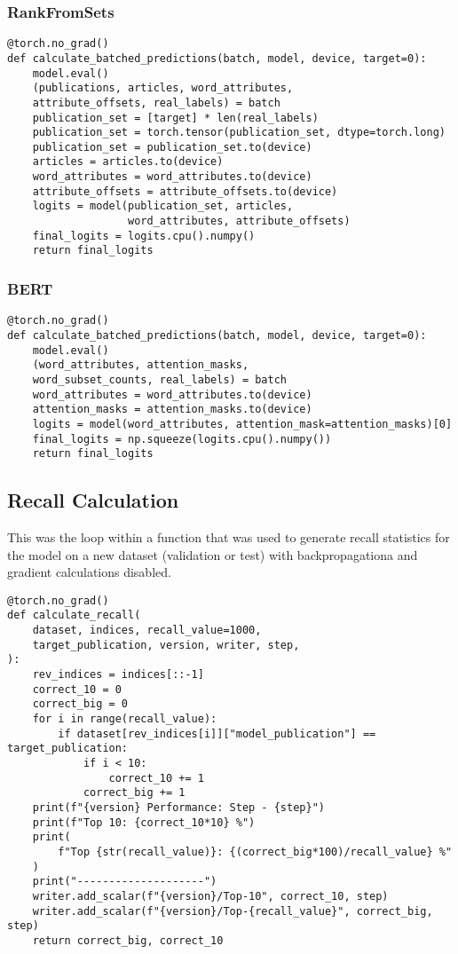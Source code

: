 \subsubsection{RankFromSets}
\begin{verbatim}
@torch.no_grad()
def calculate_batched_predictions(batch, model, device, target=0):
    model.eval()
    (publications, articles, word_attributes, 
    attribute_offsets, real_labels) = batch
    publication_set = [target] * len(real_labels)
    publication_set = torch.tensor(publication_set, dtype=torch.long)
    publication_set = publication_set.to(device)
    articles = articles.to(device)
    word_attributes = word_attributes.to(device)
    attribute_offsets = attribute_offsets.to(device)
    logits = model(publication_set, articles, 
    			   word_attributes, attribute_offsets)
    final_logits = logits.cpu().numpy()
    return final_logits
\end{verbatim}

\subsubsection{BERT}
\begin{verbatim}
@torch.no_grad()
def calculate_batched_predictions(batch, model, device, target=0):
    model.eval()
    (word_attributes, attention_masks, 
    word_subset_counts, real_labels) = batch
    word_attributes = word_attributes.to(device)
    attention_masks = attention_masks.to(device)
    logits = model(word_attributes, attention_mask=attention_masks)[0]
    final_logits = np.squeeze(logits.cpu().numpy())
    return final_logits
\end{verbatim}

\subsection{Recall Calculation}
This was the loop within a function that was used to generate recall statistics for the model on a new dataset (validation or test) with backpropagationa and gradient calculations disabled. 

\begin{verbatim}
@torch.no_grad()
def calculate_recall(
    dataset, indices, recall_value=1000, 
    target_publication, version, writer, step,
):
    rev_indices = indices[::-1]
    correct_10 = 0
    correct_big = 0
    for i in range(recall_value):
        if dataset[rev_indices[i]]["model_publication"] == target_publication:
            if i < 10:
                correct_10 += 1
            correct_big += 1
    print(f"{version} Performance: Step - {step}")
    print(f"Top 10: {correct_10*10} %")
    print(
        f"Top {str(recall_value)}: {(correct_big*100)/recall_value} %"
    )
    print("--------------------")
    writer.add_scalar(f"{version}/Top-10", correct_10, step)
    writer.add_scalar(f"{version}/Top-{recall_value}", correct_big, step)
    return correct_big, correct_10
\end{verbatim}

